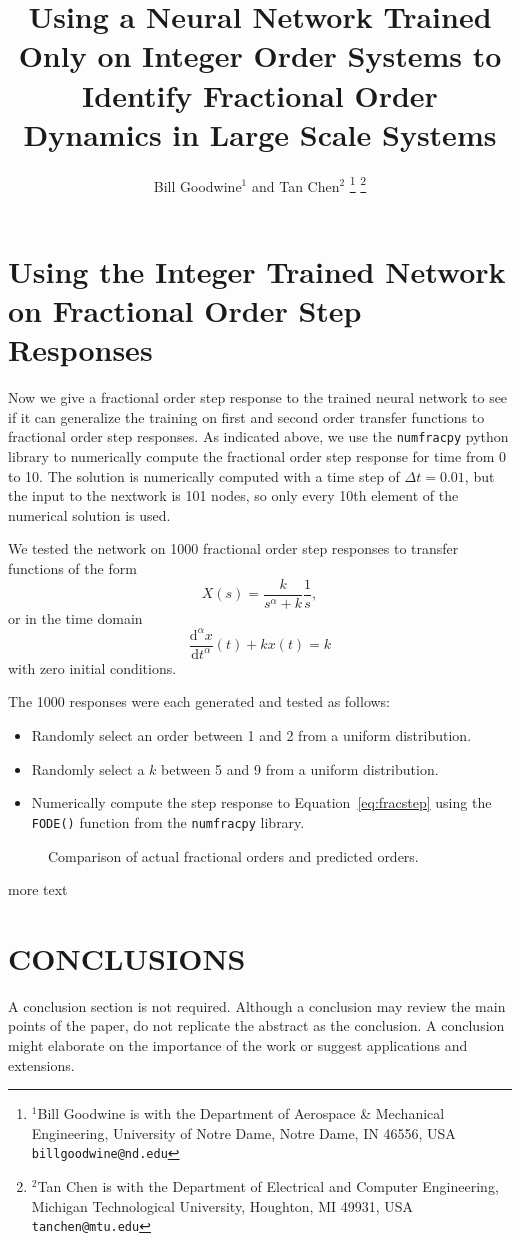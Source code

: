 \documentclass[letterpaper, 10 pt, conference]{ieeeconf}  %
\title{\LARGE \bf
Using a Neural Network Trained Only on Integer Order Systems to Identify
Fractional Order Dynamics in Large Scale Systems}
\author{Bill Goodwine$^{1}$ and Tan Chen$^{2}$%
\thanks{$^{1}$Bill Goodwine is with the Department of Aerospace \& Mechanical
  Engineering, University of Notre Dame, Notre Dame, IN 46556, USA
{\tt\small billgoodwine@nd.edu}}%
\thanks{$^{2}$Tan Chen is with the Department of Electrical and Computer
Engineering, Michigan Technological University, Houghton, MI 49931, USA
{\tt\small tanchen@mtu.edu}}
}
\renewcommand{\d}{\mathrm{d}}
\begin{document}
\maketitle
\thispagestyle{empty}
\pagestyle{empty}






\section{Using the Integer Trained Network on Fractional Order Step Responses}

Now we give a fractional order step response to the trained neural network to
see if it can generalize the training on first and second order transfer
functions to fractional order step responses. As indicated above, we use the
\texttt{numfracpy} python library to numerically compute the fractional order
step response for time from 0 to 10. The solution is numerically computed with a
time step of $\Delta t = 0.01$, but the input to the nextwork is 101 nodes, so
only every 10th element of the numerical solution is used.

We tested the network on 1000 fractional order step responses to transfer
functions of the form
\[
X(s) = \frac{k}{s^\alpha + k} \frac{1}{s},
\]
or in the time domain
\begin{equation}
\frac{\d^\alpha x}{\d t^\alpha}(t) + k x(t) = k
\label{eq:fracstep}
\end{equation}
with zero initial conditions. 

The 1000 responses were each generated and tested as follows: 
\begin{itemize}
\item Randomly select an order between 1 and 2 from a uniform distribution.
\item Randomly select a $k$ between 5 and 9 from a uniform distribution.
\item Numerically compute the step response to Equation~\ref{eq:fracstep} using
the \texttt{FODE()} function from the \texttt{numfracpy} library. 
\end{itemize}

\begin{figure}
\centering

\vspace*{-5pt}
\caption{Comparison of actual fractional orders and predicted orders.}
\label{fig:accuracy}
\end{figure}

more text

\section{CONCLUSIONS}

A conclusion section is not required. Although a conclusion may review the main
points of the paper, do not replicate the abstract as the conclusion. A
conclusion might elaborate on the importance of the work or suggest applications
and extensions. 

\addtolength{\textheight}{-12cm} 



\end{document}

